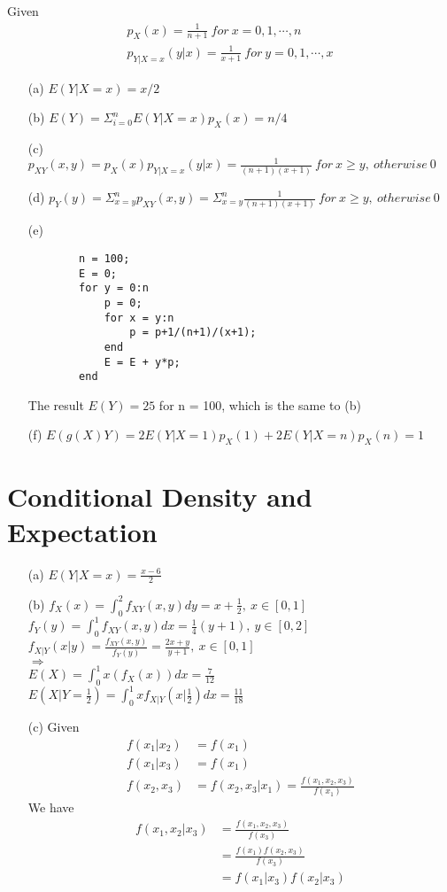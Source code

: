 \documentclass{article}
\begin{document}
\subsection{}
Given
\begin{align*}
    p_X(x)=\frac{1}{n+1}\ for\ x = 0,1,\cdots ,n\\
    p_{Y|X=x}(y|x)=\frac{1}{x+1}\ for \ y=0,1,\cdots ,x
\end{align*}
\begin{itemize}
    \item [(a)] 
    $E(Y|X=x)=x/2$
    \item [(b)] 
    $E(Y)=\Sigma^{n}_{i=0}E(Y|X=x)p_X(x)=n/4$
    \item [(c)] 
    $p_{XY}(x,y)=p_X(x)p_{Y|X=x}(y|x)=\frac{1}{(n+1)(x+1)}\ for\ x\geq y,\ otherwise\ 0$
    \item [(d)] 
    $p_Y(y)=\Sigma^n_{x=y}p_{XY}(x,y)=\Sigma^n_{x=y}\frac{1}{(n+1)(x+1)}\ for\ x\geq y,\ otherwise\ 0$
    \item [(e)] 
    \begin{lstlisting}
        n = 100;
        E = 0;
        for y = 0:n
            p = 0;
            for x = y:n
                p = p+1/(n+1)/(x+1);
            end
            E = E + y*p;
        end
    \end{lstlisting}
    The result $E(Y)=25$ for n = 100, which is the same to (b)
    \item [(f)] 
    $E(g(X)Y)=2E(Y|X=1)p_X(1)+2E(Y|X=n)p_X(n)=1$
\end{itemize}


\section{Conditional Density and Expectation}
\begin{itemize}
    \item [(a)]
    $E(Y|X=x)=\frac{x-6}{2}$
    \item [(b)] 
    $f_X(x)=\int_0^2f_{XY}(x,y)dy=x+\frac{1}{2},\ x\in[0,1]$\\
    $f_Y(y)=\int_0^1f_{XY}(x,y)dx=\frac{1}{4}(y+1),\ y\in[0,2]$\\
    $f_{X|Y}(x|y)=\frac{f_{XY}(x,y)}{f_Y(y)}=\frac{2x+y}{y+1},\ x\in[0,1]$\\
    $\Rightarrow$\\
    $E(X)=\int_0^1x(f_X(x))dx=\frac{7}{12}$\\
    $E(X|Y=\frac{1}{2})=\int_0^1xf_{X|Y}(x|\frac{1}{2})dx=\frac{11}{18}$
    \item [(c)]
    Given
    \begin{align*}
        f(x_1|x_2)&=f(x_1)\\
        f(x_1|x_3)&=f(x_1)\\
        f(x_2,x_3)&=f(x_2,x_3|x_1)=\frac{f(x_1,x_2,x_3)}{f(x_1)}
    \end{align*}
    We have
    \begin{align*}
        f(x_1,x_2|x_3)&=\frac{f(x_1,x_2,x_3)}{f(x_3)}\\
        &=\frac{f(x_1)f(x_2,x_3)}{f(x_3)}\\
        &=f(x_1|x_3)f(x_2|x_3)
    \end{align*}
\end{itemize}
\end{document}
